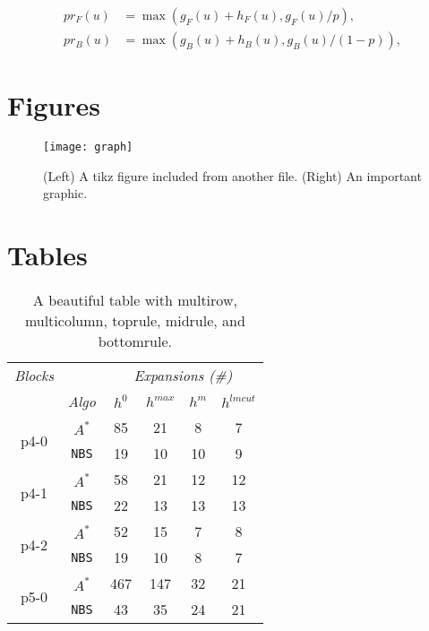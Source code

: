 \begin{align*}
pr_F(u) &= \max(g_F(u)+h_F(u), g_F(u)/p),\\
pr_B(u) &= \max(g_B(u)+h_B(u), g_B(u)/(1-p)),
\end{align*}

\section{Figures}

\begin{figure}[ht] %
    \centering    
    \begin{minipage}{.49\textwidth}
        \centering
        \resizebox{0.8\textwidth}{!}{%
        
        }
    \end{minipage}        
    \begin{minipage}{.49\textwidth}
        \centering
        \texttt{[image: graph]}
    \end{minipage} 
    \caption{(Left) A tikz figure included from another file. (Right) An important graphic.}
    \label{fig:gmx2}
\end{figure}

\section{Tables}\label{sec:A:tables}
\begin{table}[H]\centering{}
\begin{tabular}{c|c|cccc}
\midrule
\multicolumn{1}{c}{\textit{Blocks}} &  &\multicolumn{4}{c}{\textit{Expansions (\#)}}\\
\cmidrule(){3-6}
 & \textit{Algo} & $h^0$ & $h^{max}$ & $h^m$ & $h^{lmcut}$\\
\toprule
\multirow{ 2}{*}{p4-0}& $A^*$ & 85 & 21 & 8 & 7\\
& \texttt{NBS} & 19 & 10 & 10 & 9 \\
\midrule
\multirow{ 2}{*}{p4-1}& $A^*$ & 58 & 21 & 12 & 12\\
& \texttt{NBS} & 22 & 13 & 13 & 13\\
\midrule
\multirow{ 2}{*}{p4-2}& $A^*$ & 52 & 15 & 7 & 8\\
& \texttt{NBS} & 19 & 10 & 8 & 7\\
\midrule
\multirow{ 2}{*}{p5-0}& $A^*$ & 467 & 147 & 32 & 21\\
& \texttt{NBS} & 43 & 35 & 24 & 21\\
\bottomrule
\end{tabular}
\caption{A beautiful table with multirow, multicolumn, toprule, midrule, and bottomrule.}\label{tab:A:tables:sampleTable}
\end{table}


